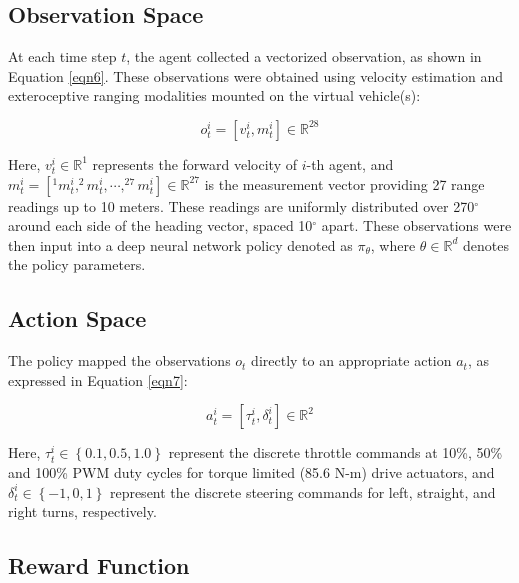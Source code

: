 \documentclass[letterpaper, 10 pt, conference]{ieeeconf}  %
\begin{document}
	\subsection{Observation Space}
	\label{Sub-Section: Observation Space II}
	
	At each time step $t$, the agent collected a vectorized observation, as shown in Equation \ref{eqn6}. These observations were obtained using velocity estimation and exteroceptive ranging modalities mounted on the virtual vehicle(s):
	
	\begin{equation}
	o_t^i = \left [ v_t^i, m_t^i \right ] \in \mathbb{R}^{28}
	\label{eqn6}
	\end{equation}
	
	Here, $v_t^i \in \mathbb{R}^{1}$ represents the forward velocity of $i$-th agent, and $m_t^i = \left [ ^{1}m_t^i, ^{2}m_t^i, \cdots, ^{27}m_t^i \right ] \in \mathbb{R}^{27}$ is the measurement vector providing 27 range readings up to 10 meters. These readings are uniformly distributed over 270$^{\circ}$ around each side of the heading vector, spaced 10$^{\circ}$ apart. These observations were then input into a deep neural network policy denoted as $\pi_{\theta}$, where $\theta \in \mathbb{R}^d$ denotes the policy parameters.
	
	\subsection{Action Space}
	\label{Sub-Section: Action Space II}
	
	The policy mapped the observations $o_t$ directly to an appropriate action $a_t$, as expressed in Equation \ref{eqn7}:
	
	\begin{equation}
	a_t^i = \left [ \tau_t^i, \delta_t^i \right ] \in \mathbb{R}^{2}
	\label{eqn7}
	\end{equation}
	
	Here, $\tau_t^i \in \left \{ 0.1, 0.5, 1.0 \right \}$ represent the discrete throttle commands at 10\%, 50\% and 100\% PWM duty cycles for torque limited (85.6 N-m) drive actuators, and $\delta_t^i \in \left \{ -1, 0, 1 \right \}$ represent the discrete steering commands for left, straight, and right turns, respectively.
	
	\subsection{Reward Function}
	\label{Sub-Section: Reward Function II}
	
\end{document}
